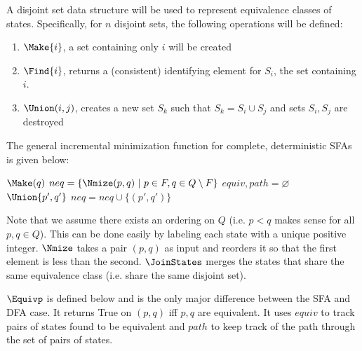 \documentclass[12pt]{article}
\newcommand{\suchthat}{\hphantom l | \hphantom l}
\begin{document}
A disjoint set data structure will be used to represent equivalence classes of states. Specifically, for $n$ disjoint sets, the following operations will be defined:
\begin{enumerate}
\item $\Make{i}$, a set containing only $i$ will be created
\item $\Find{i}$, returns a (consistent) identifying element for $S_i$, the set containing $i$.
\item $\Union(i,j)$, creates a new set $S_k$ such that $S_k = S_i \cup S_j$ and sets $S_i, S_j$ are destroyed
\end{enumerate} 

The general incremental minimization function for complete, deterministic SFAs is given below:

\begin{algorithm}
{
	{
		$\Make(q)$
	}
	$neq = \{ \Nmize(p,q) \suchthat p \in F, q \in Q \setminus F \}$ 
	{
		\For{$q \in \{x \in Q \suchthat x > p\}$}
		{
			{
				\Cont
			}
			{
				\Cont
			}
			$equiv, path = \varnothing$\\
			{
				{
					$\Union{p',q'}$
				}
			}
			\Else
			{
				{
					$neq  = neq \cup \{(p',q')\}$
				}
			}
		}
	}
}
\end{algorithm}

Note that we assume there exists an ordering on $Q$ (i.e. $p < q$ makes sense for all $p,q \in Q$). This can be done easily by labeling each state with a unique positive integer. $\Nmize$ takes a pair $(p,q)$ as input and reorders it so that the first element is less than the second.
$\JoinStates$ merges the states that share the same equivalence class (i.e. share the same disjoint set).

\newpage

$\Equivp$ is defined below and is the only major difference between the SFA and DFA case. It returns True on $(p,q)$ iff $p,q$ are equivalent. It uses $equiv$ to track pairs of states found to be equivalent and $path$ to keep track of the path through the set of pairs of states.
\end{document}
